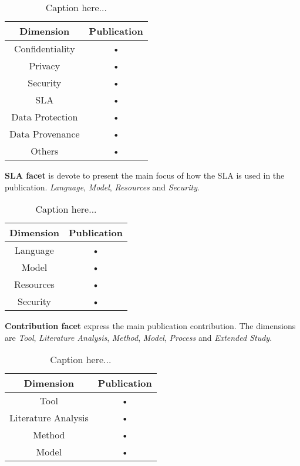\documentclass[preprint,12pt]{elsarticle}
\theoremstyle{plain}
\theoremstyle{plain}
\theoremstyle{plain}
\theoremstyle{plain}
\begin{document}
\begin{description}
\begin{table}[h]
\caption{Caption here...}
\begin{center}
\begin{tabular}{|c|c|}
\hline 
\textbf{Dimension} & \textbf{Publication} \\ 
\hline 
Confidentiality & • \\ 
\hline 
Privacy & • \\ 
\hline 
Security & • \\ 
\hline 
SLA & • \\ 
\hline 
Data Protection & • \\ 
\hline 
Data Provenance & • \\ 
\hline 
Others & • \\ 
\hline 
\end{tabular}
\end{center}
\end{table}
\item \textbf{SLA facet} is devote to present the main focus of how the SLA is used in the publication.  \textit{Language}, \textit{Model}, \textit{Resources} and \textit{Security}.
\begin{table}[h]
\caption{Caption here...}
\begin{center}
\begin{tabular}{|c|c|}
\hline 
\textbf{Dimension} & \textbf{Publication} \\ 
\hline 
Language & • \\ 
\hline 
Model & • \\ 
\hline 
Resources & • \\ 
\hline 
Security & • \\ 
\hline 
\end{tabular}
\end{center}
\end{table}
\item \textbf{Contribution facet} express the main publication contribution. 
The dimensions are \textit{Tool}, \textit{Literature Analysis}, \textit{Method}, \textit{Model}, \textit{Process} and \textit{Extended Study}.
\begin{table}[h]
\caption{Caption here...}
\begin{center}
\begin{tabular}{|c|c|}
\hline 
\textbf{Dimension} & \textbf{Publication} \\ 
\hline 
Tool & • \\ 
\hline 
Literature Analysis & • \\ 
\hline 
Method & • \\ 
\hline 
Model & • \\ 

\end{tabular}
\end{center}
\end{table}
\end{description}
\end{document}
